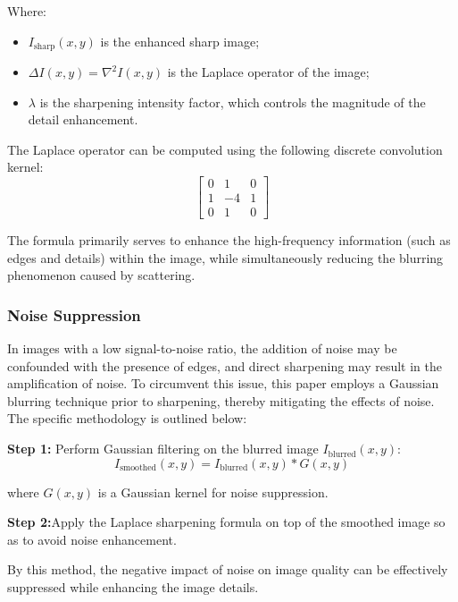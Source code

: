 \documentclass[withoutpreface,bwprint]{cumcmthesis}
\begin{document}
Where:

\begin{itemize}[itemindent=2em]
    \item $I_{\text{sharp}}(x, y)$ is the enhanced sharp image;

    \item $\Delta I(x, y) = \nabla^2 I(x, y)$ is the Laplace operator of the image;

    \item $\lambda$ is the sharpening intensity factor, which controls the magnitude of the detail enhancement.
\end{itemize}

The Laplace operator can be computed using the following discrete convolution kernel:
\[\begin{bmatrix}
0 & 1 & 0 \\
1 & -4 & 1 \\
0 & 1 & 0
\end{bmatrix}\]

The formula primarily serves to enhance the high-frequency information (such as edges and details) within the image, while simultaneously reducing the blurring phenomenon caused by scattering.

\subsubsection{Noise Suppression}

In images with a low signal-to-noise ratio, the addition of noise may be confounded with the presence of edges, and direct sharpening may result in the amplification of noise. To circumvent this issue, this paper employs a Gaussian blurring technique prior to sharpening, thereby mitigating the effects of noise. The specific methodology is outlined below:

\textbf{Step 1:} Perform Gaussian filtering on the blurred image $I_{\text{blurred}}(x, y)$:
\[I_{\text{smoothed}}(x, y) = I_{\text{blurred}}(x, y) * G(x, y)\]

where $G(x, y)$ is a Gaussian kernel for noise suppression.

\vspace{0.5em}
\textbf{Step 2:}Apply the Laplace sharpening formula on top of the smoothed image so as to avoid noise enhancement.

By this method, the negative impact of noise on image quality can be effectively suppressed while enhancing the image details.


\newpage
\end{document}
